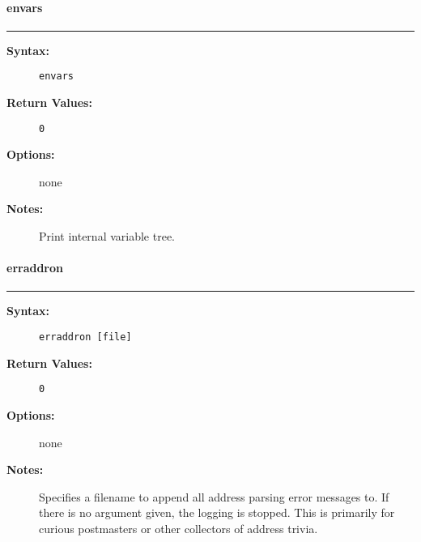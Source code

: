 \vspace {2pt}


\paragraph{envars}

\hrule
\begin{description}
\item[{\bf Syntax:}] \mbox{}

{\tt envars}

\item[{\bf Return Values:}] \mbox{}

\begin{description}
\item[{\tt 0}] \mbox{}



\end{description}


\item[{\bf Options:}] \mbox{}

none  

\item[{\bf Notes:}] \mbox{}

Print internal variable tree.

\end{description}


\vspace {2pt}


\paragraph{erraddron}

\hrule
\begin{description}
\item[{\bf Syntax:}] \mbox{}

{\tt erraddron [file]}

\item[{\bf Return Values:}] \mbox{}

\begin{description}
\item[{\tt 0}] \mbox{}



\end{description}


\item[{\bf Options:}] \mbox{}

none  

\item[{\bf Notes:}] \mbox{}

Specifies a filename to append all address 
parsing error messages to. If there is no argument given, the 
logging is stopped. This is primarily for curious postmasters 
or other collectors of address trivia.

\end{description}


